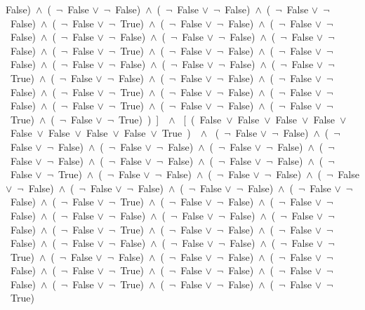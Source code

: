 ﻿\documentclass[a4paper,10pt]{article}
\begin{document}
False)\ $\wedge$\ (\  $\neg$\ False $\vee$\  $\neg$\ False)\ $\wedge$\ (\  $\neg$\ False $\vee$\  $\neg$\ False)\ $\wedge$\ (\  $\neg$\ False $\vee$\  $\neg$\ False)\ $\wedge$\ (\  $\neg$\ False $\vee$\  $\neg$\ True)\ $\wedge$\ (\  $\neg$\ False $\vee$\  $\neg$\ False)\ $\wedge$\ (\  $\neg$\ False $\vee$\  $\neg$\ False)\ $\wedge$\ (\  $\neg$\ False $\vee$\  $\neg$\ False)\ $\wedge$\ (\  $\neg$\ False $\vee$\  $\neg$\ False)\ $\wedge$\ (\  $\neg$\ False $\vee$\  $\neg$\ False)\ $\wedge$\ (\  $\neg$\ False $\vee$\  $\neg$\ True)\ $\wedge$\ (\  $\neg$\ False $\vee$\  $\neg$\ False)\ $\wedge$\ (\  $\neg$\ False $\vee$\  $\neg$\ False)\ $\wedge$\ (\  $\neg$\ False $\vee$\  $\neg$\ False)\ $\wedge$\ (\  $\neg$\ False $\vee$\  $\neg$\ False)\ $\wedge$\ (\  $\neg$\ False $\vee$\  $\neg$\ True)\ $\wedge$\ (\  $\neg$\ False $\vee$\  $\neg$\ False)\ $\wedge$\ (\  $\neg$\ False $\vee$\  $\neg$\ False)\ $\wedge$\ (\  $\neg$\ False $\vee$\  $\neg$\ False)\ $\wedge$\ (\  $\neg$\ False $\vee$\  $\neg$\ True)\ $\wedge$\ (\  $\neg$\ False $\vee$\  $\neg$\ False)\ $\wedge$\ (\  $\neg$\ False $\vee$\  $\neg$\ False)\ $\wedge$\ (\  $\neg$\ False $\vee$\  $\neg$\ True)\ $\wedge$\ (\  $\neg$\ False $\vee$\  $\neg$\ False)\ $\wedge$\ (\  $\neg$\ False $\vee$\  $\neg$\ True)\ $\wedge$\ (\  $\neg$\ False $\vee$\  $\neg$\ True)\ )\ ]\ \ $\wedge$ \ [\ (\ False\ $\vee$\ False\ $\vee$\ False\ $\vee$\ False\ $\vee$\ False\ $\vee$\ False\ $\vee$\ False\ $\vee$\ False\ $\vee$\ True\ )\ \ $\wedge$ \ (\  $\neg$\ False $\vee$\  $\neg$\ False)\ $\wedge$\ (\  $\neg$\ False $\vee$\  $\neg$\ False)\ $\wedge$\ (\  $\neg$\ False $\vee$\  $\neg$\ False)\ $\wedge$\ (\  $\neg$\ False $\vee$\  $\neg$\ False)\ $\wedge$\ (\  $\neg$\ False $\vee$\  $\neg$\ False)\ $\wedge$\ (\  $\neg$\ False $\vee$\  $\neg$\ False)\ $\wedge$\ (\  $\neg$\ False $\vee$\  $\neg$\ False)\ $\wedge$\ (\  $\neg$\ False $\vee$\  $\neg$\ True)\ $\wedge$\ (\  $\neg$\ False $\vee$\  $\neg$\ False)\ $\wedge$\ (\  $\neg$\ False $\vee$\  $\neg$\ False)\ $\wedge$\ (\  $\neg$\ False $\vee$\  $\neg$\ False)\ $\wedge$\ (\  $\neg$\ False $\vee$\  $\neg$\ False)\ $\wedge$\ (\  $\neg$\ False $\vee$\  $\neg$\ False)\ $\wedge$\ (\  $\neg$\ False $\vee$\  $\neg$\ False)\ $\wedge$\ (\  $\neg$\ False $\vee$\  $\neg$\ True)\ $\wedge$\ (\  $\neg$\ False $\vee$\  $\neg$\ False)\ $\wedge$\ (\  $\neg$\ False $\vee$\  $\neg$\ False)\ $\wedge$\ (\  $\neg$\ False $\vee$\  $\neg$\ False)\ $\wedge$\ (\  $\neg$\ False $\vee$\  $\neg$\ False)\ $\wedge$\ (\  $\neg$\ False $\vee$\  $\neg$\ False)\ $\wedge$\ (\  $\neg$\ False $\vee$\  $\neg$\ True)\ $\wedge$\ (\  $\neg$\ False $\vee$\  $\neg$\ False)\ $\wedge$\ (\  $\neg$\ False $\vee$\  $\neg$\ False)\ $\wedge$\ (\  $\neg$\ False $\vee$\  $\neg$\ False)\ $\wedge$\ (\  $\neg$\ False $\vee$\  $\neg$\ False)\ $\wedge$\ (\  $\neg$\ False $\vee$\  $\neg$\ True)\ $\wedge$\ (\  $\neg$\ False $\vee$\  $\neg$\ False)\ $\wedge$\ (\  $\neg$\ False $\vee$\  $\neg$\ False)\ $\wedge$\ (\  $\neg$\ False $\vee$\  $\neg$\ False)\ $\wedge$\ (\  $\neg$\ False $\vee$\  $\neg$\ True)\ $\wedge$\ (\  $\neg$\ False $\vee$\  $\neg$\ False)\ $\wedge$\ (\  $\neg$\ False $\vee$\  $\neg$\ False)\ $\wedge$\ (\  $\neg$\ False $\vee$\  $\neg$\ True)\ $\wedge$\ (\  $\neg$\ False $\vee$\  $\neg$\ False)\ $\wedge$\ (\  $\neg$\ False $\vee$\  $\neg$\ True)\ 
\end{document}

